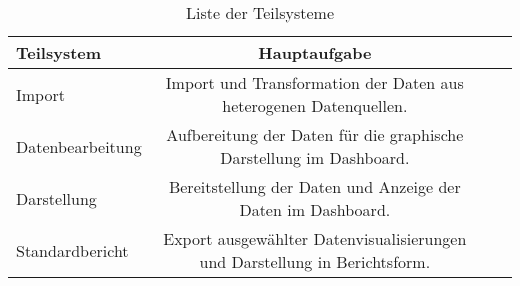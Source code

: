        \begingroup
            \setlength{\tabcolsep}{4pt} %
            \renewcommand{\arraystretch}{1.5}
            \begin{table}[h]
                \centering
                \begin{adjustbox}{max width=\textwidth}
                \Huge
                \begin{tabular}{lccl}
                   \toprule
                   \textbf{Teilsystem}             &{Hauptaufgabe} \\
                   \midrule     
                        Import               &Import und Transformation der Daten aus heterogenen Datenquellen.\\
                        Datenbearbeitung     &Aufbereitung der Daten für die graphische Darstellung im Dashboard.\\
                        Darstellung          &Bereitstellung der Daten und Anzeige der Daten im Dashboard.\\
                        Standardbericht      &Export ausgewählter Datenvisualisierungen und Darstellung in Berichtsform.\\

                    \bottomrule
                \end{tabular}
                \end{adjustbox}
                \caption{%
                    Liste der Teilsysteme
                \label{tab:Teilsysteme}
                }
                 \end{table}
            \endgroup
    



    



    
    
    
    




